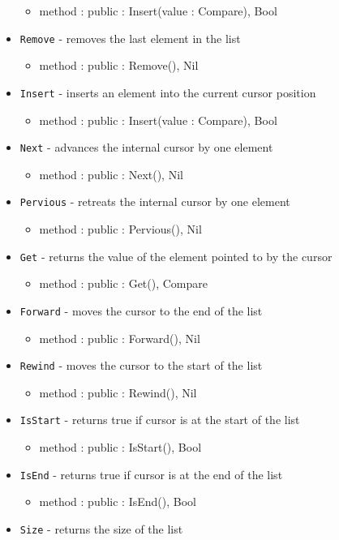 \documentclass[12pt]{article}
\begin{document}
\begin{itemize}
\begin{itemize}
  \item method : public : Insert(value : Compare), Bool
  \end{itemize}
\item \texttt{Remove} - removes the last element in the list
  \begin{itemize}
  \item method : public : Remove(), Nil
  \end{itemize}
\item \texttt{Insert} - inserts an element into the current cursor position
  \begin{itemize}
  \item method : public : Insert(value : Compare), Bool
  \end{itemize}	
\item \texttt{Next} - advances the internal cursor by one element
  \begin{itemize}
  \item method : public : Next(), Nil
  \end{itemize}
\item \texttt{Pervious} - retreats the internal cursor by one element
  \begin{itemize}
  \item method : public : Pervious(), Nil
  \end{itemize}
\item \texttt{Get} - returns the value of the element  pointed to by the cursor
  \begin{itemize}
  \item method : public : Get(), Compare
  \end{itemize}
\item \texttt{Forward} - moves the cursor to the end of the list
  \begin{itemize}
  \item method : public : Forward(), Nil
  \end{itemize}
\item \texttt{Rewind} - moves the cursor to the start of the list
  \begin{itemize}
  \item method : public : Rewind(), Nil
  \end{itemize}
\item \texttt{IsStart} - returns true if cursor is at the start of the list
  \begin{itemize}
  \item method : public : IsStart(), Bool
  \end{itemize}
\item \texttt{IsEnd} - returns true if cursor is at the end of the list
  \begin{itemize}
  \item method : public : IsEnd(), Bool
  \end{itemize}		
\item \texttt{Size} - returns the size of the list
\end{itemize}
\end{document}
